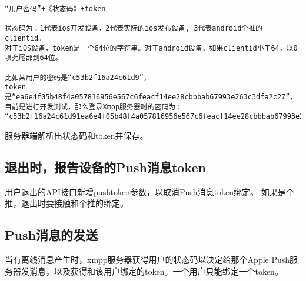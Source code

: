 \begin{verbatim}
“用户密码”+《状态码》+token

状态码为：1代表ios开发设备，2代表实际的ios发布设备, 3代表android个推的clientid。
对于iOS设备，token是一个64位的字符串。对于android设备，如果clientid小于64，以0填充尾部到64位。

比如某用户的密码是“c53b2f16a24c61d9”，
token是“ea6e4f05b48f4a057816956e567c6feacf14ee28cbbbab67993e263c3dfa2c27”，
目前是进行开发测试，那么登录Xmpp服务器时的密码为：
“c53b2f16a24c61d91ea6e4f05b48f4a057816956e567c6feacf14ee28cbbbab67993e263c3dfa2c27”。
\end{verbatim}

服务器端解析出状态码和token并保存。


\subsection{退出时，报告设备的Push消息token}

用户退出的API接口新增pushtoken参数，以取消Push消息token绑定。
如果是个推，退出时要接触和个推的绑定。

\subsection{Push消息的发送}
当有离线消息产生时，xmpp服务器获得用户的状态码以决定给那个Apple Push服务器发消息，以及获得和该用户绑定的token。一个用户只能绑定一个token。
